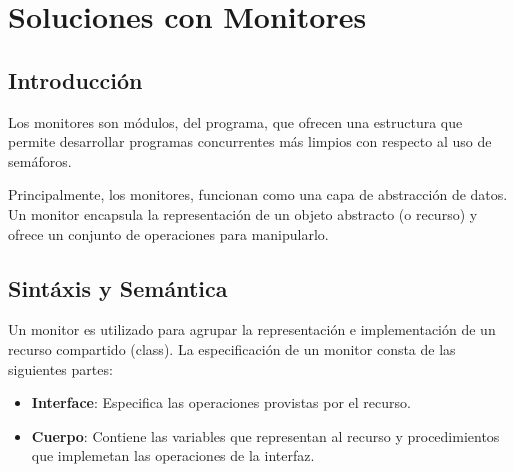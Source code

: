 \documentclass[a4paper, 10pt]{report}
\begin{document}
\chapter{Soluciones con Monitores}

\section{Introducción}

Los monitores son módulos, del programa, que ofrecen una estructura que permite desarrollar programas concurrentes más limpios con respecto al uso de semáforos.

Principalmente, los monitores, funcionan como una capa de abstracción de datos. Un monitor encapsula la representación de un objeto abstracto (o recurso) y ofrece un conjunto de operaciones para manipularlo.




\section{Sintáxis y Semántica}

Un monitor es utilizado para agrupar la representación e implementación de un recurso compartido (class). La especificación de un monitor consta de las siguientes partes:

\begin{itemize}
	\item \textbf{Interface}: Especifica las operaciones provistas por el recurso.
	\item \textbf{Cuerpo}: Contiene las variables que representan al recurso y procedimientos que implemetan las operaciones de la interfaz.
\end{itemize}
\end{document}
